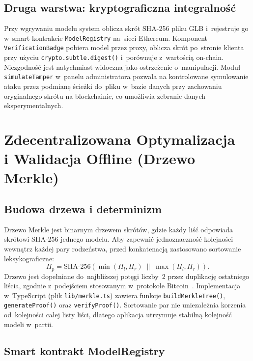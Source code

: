 \documentclass[10pt,conference,a4paper]{IEEEtran}
\begin{document}
\subsection{Druga warstwa: kryptograficzna integralność}

Przy wgrywaniu modelu system oblicza skrót SHA-256 pliku GLB
i~rejestruje go w~smart kontrakcie \texttt{ModelRegistry}
na~sieci Ethereum. Komponent \texttt{VerificationBadge} pobiera
model przez proxy, oblicza skrót po~stronie klienta przy użyciu
\texttt{crypto.subtle.digest()} i~porównuje z~wartością
on-chain. Niezgodność jest natychmiast widoczna jako ostrzeżenie
o~manipulacji. Moduł \texttt{simulateTamper} w~panelu
administratora pozwala na kontrolowane symulowanie ataku przez
podmianę ścieżki do~pliku w~bazie danych przy zachowaniu
oryginalnego skrótu na blockchainie, co umożliwia zebranie
danych eksperymentalnych.

\section{Zdecentralizowana Optymalizacja\\
         i Walidacja Offline (Drzewo Merkle)}

\subsection{Budowa drzewa i determinizm}

Drzewo Merkle jest binarnym drzewem skrótów, gdzie każdy liść
odpowiada skrótowi SHA-256 jednego modelu. Aby zapewnić
jednoznaczność kolejności wewnątrz każdej pary rodzeństwa,
przed konkatenacją zastosowano sortowanie leksykograficzne:
\begin{equation}
  H_p = \mathrm{SHA\text{-}256}\!\left(
        \min(H_l,H_r)\;\|\;\max(H_l,H_r)\right).
\end{equation}
Drzewo jest dopełniane do~najbliższej potęgi liczby~2 przez
duplikację ostatniego liścia, zgodnie z~podejściem stosowanym
w~protokole Bitcoin~\cite{nakamoto2008}. Implementacja
w~TypeScript (plik \texttt{lib/merkle.ts}) zawiera funkcje
\texttt{buildMerkleTree()}, \texttt{generateProof()}
oraz \texttt{verifyProof()}. Sortowanie par nie uniezależnia
korzenia od~kolejności całej listy liści, dlatego aplikacja
utrzymuje stabilną kolejność modeli w~partii.

\subsection{Smart kontrakt ModelRegistry}
\end{document}
